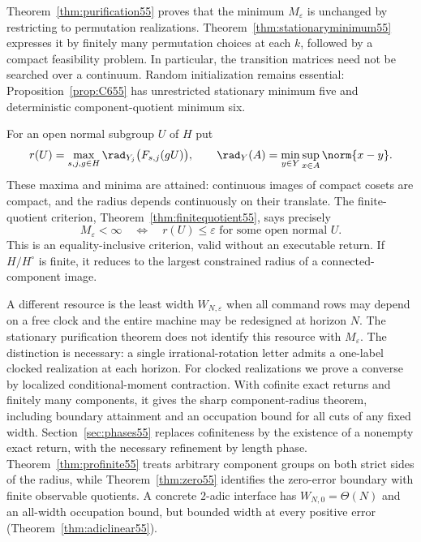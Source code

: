 Theorem~\ref{thm:purification55} proves that the minimum $M_\varepsilon$ is unchanged by restricting to permutation realizations. Theorem~\ref{thm:stationaryminimum55} expresses it by finitely many permutation choices at each $k$, followed by a compact feasibility problem. In particular, the transition matrices need not be searched over a continuum. Random initialization remains essential: Proposition~\ref{prop:C655} has unrestricted stationary minimum five and deterministic component-quotient minimum six.

For an open normal subgroup $U$ of $H$ put
\begin{equation}\label{eq:quotientradius55}
 r(U)=\max_{s,j,g\in H}\rad_{Y_j}\bigl(F_{s,j}(gU)\bigr),
 \qquad
 \rad_Y(A)=\min_{y\in Y}\sup_{x\in A}\norm{x-y}.
\end{equation}
These maxima and minima are attained: continuous images of compact cosets are compact, and the radius depends continuously on their translate. The finite-quotient criterion, Theorem~\ref{thm:finitequotient55}, says precisely
\[
          M_\varepsilon<\infty
          \quad\Longleftrightarrow\quad
          r(U)\le\varepsilon\text{ for some open normal }U.
\]
This is an equality-inclusive criterion, valid without an executable return. If $H/H^\circ$ is finite, it reduces to the largest constrained radius of a connected-component image.

A different resource is the least width $W_{N,\varepsilon}$ when all command rows may depend on a free clock and the entire machine may be redesigned at horizon $N$. The stationary purification theorem does not identify this resource with $M_\varepsilon$. The distinction is necessary: a single irrational-rotation letter admits a one-label clocked realization at each horizon. For clocked realizations we prove a converse by localized conditional-moment contraction. With cofinite exact returns and finitely many components, it gives the sharp component-radius theorem, including boundary attainment and an occupation bound for all cuts of any fixed width. Section~\ref{sec:phases55} replaces cofiniteness by the existence of a nonempty exact return, with the necessary refinement by length phase. Theorem~\ref{thm:profinite55} treats arbitrary component groups on both strict sides of the radius, while Theorem~\ref{thm:zero55} identifies the zero-error boundary with finite observable quotients. A concrete $2$-adic interface has $W_{N,0}=\Theta(N)$ and an all-width occupation bound, but bounded width at every positive error (Theorem~\ref{thm:adiclinear55}).

